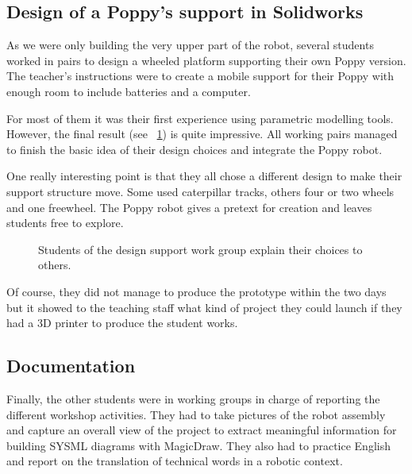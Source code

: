 \subsection{Design of a Poppy's support in Solidworks} %

As we were only building the very upper part of the robot, several students worked in pairs to design a wheeled platform supporting their own Poppy version. The teacher’s instructions were to create a mobile support for their Poppy with enough room to include batteries and a computer.

For most of them it was their first experience using parametric modelling tools. However, the final result (see \figurename~\ref{fig:saintonge_support}) is quite impressive. All working pairs managed to finish the basic idea of their design choices and integrate the Poppy robot.

One really interesting point is that they all chose a different design to make their support structure move. Some used caterpillar tracks, others four or two wheels and one freewheel. The Poppy robot gives a pretext for creation and leaves students free to explore.

\begin{figure}[tb]
\centering
    \hfill
    \hfill
    \caption{Students of the design support work group explain their choices to others.}
    \label{fig:saintonge_support}
\end{figure}

Of course,  they did not manage to produce the prototype within the two days but it showed to the teaching staff what kind of project they could launch if they had a 3D printer to produce the student works.

\subsection{Documentation } %

Finally, the other students were in working groups in charge of reporting the different workshop activities. They had to take pictures of the robot assembly and capture an overall view of the project to extract meaningful information for building SYSML diagrams with MagicDraw. They also had to practice English and report on the translation of technical words in a robotic context.

